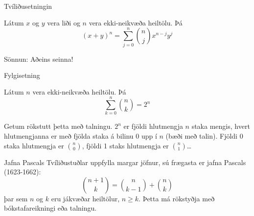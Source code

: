 \documentclass[handout]{beamer}
\begin{document}
\begin{frame}{Tvíliðusetningin}
\begin{tcolorbox}[title=Tvíliðusetningin (e. \emph{the binomial theorem})]
Látum $x$ og $y$ vera liði og $n$ vera ekki-neikvæða heiltölu. Þá
\[
 (x + y)^n = \sum_{j=0}^n \binom{n}{j} x^{n-j} y^j
\]
\end{tcolorbox}
Sönnun: Aðeins seinna!
\end{frame}

\begin{frame}{Fylgisetning}
\begin{tcolorbox}[title=Fylgisetning tvíliðusetningarinnar]
Látum $n$ vera ekki-neikvæða heiltölu. Þá
\[
 \sum_{k=0}^n \binom{n}{k} = 2^n
\]
\end{tcolorbox}
Getum rökstutt þetta með talningu. $2^n$ er fjöldi hlutmengja $n$ staka mengis, hvert hlutmengjanna er með fjölda staka á bilinu $0$ upp í $n$ (bæði með talin). Fjöldi 0 staka hlutmengja er $\binom{n}{0}$, fjöldi 1 staks hlutmengja er $\binom{n}{1}$\ldots
\end{frame}

\begin{frame}{Jafna Pascals}
Tvíliðustuðlar uppfylla margar jöfnur, sú frægasta er jafna Pascals (1623-1662):
\[
\binom{n+1}{k} = \binom{n}{k-1} + \binom{n}{k}
\]
þar sem $n$ og $k$ eru jákvæðar heiltölur, $n \geq k$. Þetta má rökstyðja með bókstafareikningi eða talningu.
\end{frame}
\end{document}
